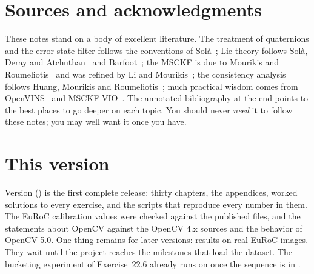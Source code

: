 \section*{Sources and acknowledgments}

These notes stand on a body of excellent literature. The treatment of quaternions and the
error-state filter follows the conventions of Solà~\cite{sola2017quaternion}; Lie theory follows
Solà, Deray and Atchuthan~\cite{sola2018micro} and Barfoot~\cite{barfoot2017state}; the MSCKF is
due to Mourikis and Roumeliotis~\cite{mourikis2007msckf} and was refined by Li and
Mourikis~\cite{li2013msckf2}; the consistency analysis follows Huang, Mourikis and
Roumeliotis~\cite{huang2010observability}; much practical wisdom comes from OpenVINS~\cite{geneva2020openvins}
and MSCKF-VIO~\cite{sun2018msckfvio}. The annotated bibliography at the end points to the best
places to go deeper on each topic. You should never \emph{need} it to follow these notes; you may well
want it once you have.

\section*{This version}

Version \guideversion{} (\guidedate) is the first complete release: thirty chapters, the appendices, worked solutions to every exercise, and the
scripts that reproduce every number in them. The EuRoC calibration values were checked against the published  files, and the
statements about OpenCV against the OpenCV 4.x sources and the behavior of OpenCV 5.0. One thing remains for later versions: results on real EuRoC
images. They wait until the project reaches the milestones that load the dataset. The bucketing experiment of Exercise~22.6 already runs on
 once the sequence is in .
